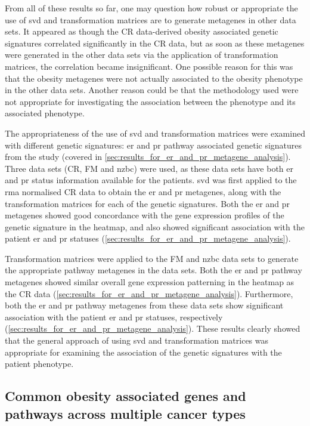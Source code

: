 From all of these results so far, one may question how robust or appropriate the use of \gls{svd} and transformation matrices are to generate metagenes in other data sets.
It appeared as though the CR data-derived obesity associated genetic signatures correlated significantly in the CR data, but as soon as these metagenes were generated in the other data sets via the application of transformation matrices, the correlation became insignificant.
One possible reason for this was that the obesity metagenes were not actually associated to the obesity phenotype in the other data sets.
Another reason could be that the methodology used were not appropriate for investigating the association between the phenotype and its associated phenotype.

The appropriateness of the use of \gls{svd} and transformation matrices were examined with different genetic signatures: \gls{er} and \gls{pr} pathway associated genetic signatures from the \citet{Gatza2010a} study (covered in \cref{sec:results_for_er_and_pr_metagene_analysis}).
Three data sets (CR, FM and \gls{nzbc}) were used, as these data sets have both \gls{er} and \gls{pr} status information available for the patients.
\gls{svd} was first applied to the \gls{rma} normalised CR data to obtain the \gls{er} and \gls{pr} metagenes, along with the transformation matrices for each of the genetic signatures.
Both the \gls{er} and \gls{pr} metagenes showed good concordance with the gene expression profiles of the genetic signature in the heatmap, and also showed significant association with the patient \gls{er} and \gls{pr} statuses (\cref{sec:results_for_er_and_pr_metagene_analysis}).

Transformation matrices were applied to the FM and \gls{nzbc} data sets to generate the appropriate pathway metagenes in the data sets.
Both the \gls{er} and \gls{pr} pathway metagenes showed similar overall gene expression patterning in the heatmap as the CR data (\cref{sec:results_for_er_and_pr_metagene_analysis}).
Furthermore, both the \gls{er} and \gls{pr} pathway metagenes from these data sets show significant association with the patient \gls{er} and \gls{pr} statuses, respectively (\cref{sec:results_for_er_and_pr_metagene_analysis}).
These results clearly showed that the general approach of using \gls{svd} and transformation matrices was appropriate for examining the association of the genetic signatures with the patient phenotype.

\subsection{Common obesity associated genes and pathways across multiple cancer types}
\label{sub:common_obesity_associated_genes_and_pathways_across_multiple_cancer_types}

